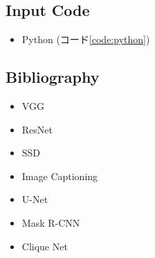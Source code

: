 \subsection{Input Code}
\begin{itemize}
	\item Python (コード\ref{code:python})
\end{itemize}


\subsection{Bibliography}
\begin{itemize}
	\item VGG \cite{bib:simonyan2014very}
	\item ResNet \cite{bib:he2016deep}
	\item SSD \cite{bib:liu2016ssd}
	\item Image Captioning \cite{bib:xu2015show}
	\item U-Net \cite{bib:ronneberger2015u}
	\item Mask R-CNN \cite{bib:he2017mask}
	\item Clique Net \cite{bib:yang2018convolutional}
\end{itemize}

